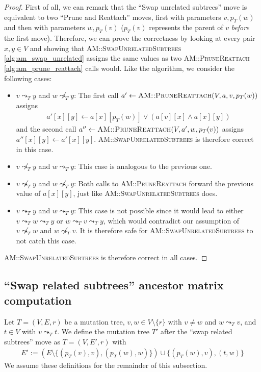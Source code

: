 \begin{proof}
    First of all, we can remark that the ``Swap unrelated subtrees'' move is equivalent to two ``Prune and Reattach'' moves, first with parameters $v, p_T(w)$ and then with parameters $w, p_T(v)$ ($p_T(v)$ represents the parent of $v$ \textit{before} the first move). Therefore, we can prove the correctness by looking at every pair $x,y \in V$ and showing that \textsc{AM::SwapUnrelatedSubtrees} \ref{alg:am_swap_unrelated} assigns the same values as two \textsc{AM::PruneReattach} \ref{alg:am_prune_reattach} calls would. Like the algorithm, we consider the following cases:
    \begin{itemize}
        \item $v \leadsto_T y$ and $w \not\leadsto_T y$: The first call $a' \leftarrow \textsc{AM::PruneReattach}(V, a, v, p_T(w))$ assigns 
        \begin{align*}
            a'[x][y] \leftarrow a[x][p_T(w)] \vee (a[v][x] \wedge a[x][y])
        \end{align*}
        and the second call $a'' \leftarrow \textsc{AM::PruneReattach}(V, a', w, p_T(v))$ assigns $a''[x][y] \leftarrow a'[x][y]$. \textsc{AM::SwapUnrelatedSubtrees} is therefore correct in this case.
        \item $v \not\leadsto_T y$ and $w \leadsto_T y$: This case is analogous to the previous one.
        \item $v \not\leadsto_T y$ and $w \not\leadsto_T y$: Both calls to \textsc{AM::PruneReattach} forward the previous value of $a[x][y]$, just like \textsc{AM::SwapUnrelatedSubtrees} does.
        \item $v \leadsto_T y$ and $w \leadsto_T y$: This case is not possible since it would lead to either $v \leadsto_T w \leadsto_T y$ or $w \leadsto_T v \leadsto_T y$, which would contradict our assumption of $v \not\leadsto_T w$ and $w \not\leadsto_T v$. It is therefore safe for \textsc{AM::SwapUnrelatedSubtrees} to not catch this case.
    \end{itemize}
    \textsc{AM::SwapUnrelatedSubtrees} is therefore correct in all cases.
\end{proof}

\subsection{``Swap related subtrees'' ancestor matrix computation}

\begin{definition}
    \label{def:swap_related_subtrees}
    Let $T = (V, E, r)$ be a mutation tree, $v, w \in V \setminus \{r\}$ with $v \neq w$ and $w \leadsto_T v$, and $t \in V$ with $v \leadsto_T t$. We define the mutation tree $T'$ after the ``swap related subtrees'' move as $T = (V, E', r)$ with
    \begin{align*}
        E' := (E \setminus \{(p_T(v), v), (p_T(w), w)\}) \cup \{(p_T(w), v), (t, w)\}
    \end{align*}
    We assume these definitions for the remainder of this subsection.
\end{definition}

